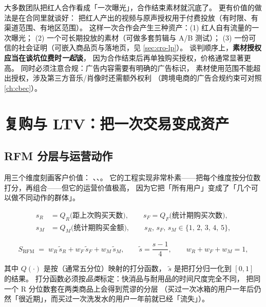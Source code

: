 \begin{keypoint}
大多数团队把红人合作看成「一次曝光」，合作结束素材就沉底了。
更有价值的做法是在合同里就谈好：
把红人产出的视频与原声授权用于付费投放（有时限、有渠道范围、有地区范围）。
这样一次合作会产生三种资产：(1) 红人自有流量的一次曝光；
(2) 一个可长期投放的素材（可做多套剪辑与 A/B 测试）；
(3) 一份可信的社会证明（可嵌入商品页与落地页，见 \cref{sec:cro-lp}）。
谈判顺序上，\textbf{素材授权应当在谈坑位费时\emph{一起}谈}，
因为合作结束后再单独购买授权，价格通常显著更高。
同时必须注意合规：广告内容需要有明确的广告标识，
素材使用范围不能超出授权，涉及第三方音乐/肖像时还需额外权利
（跨境电商的广告合规约束可对照 \cref{ch:cbec}）。
\end{keypoint}

\section{复购与 LTV：把一次交易变成资产}
\label{sec:cro-ltv}

\subsection{RFM 分层与运营动作}

 用三个维度刻画客户价值：
、、。
它的工程实现非常朴素——把每个维度按分位数打分，再组合——但它的运营价值极高，
因为它把「所有用户」变成了「几个可以做不同动作的群体」。

\begin{equation}
\begin{aligned}
s_R &= Q_R\big(\text{距上次购买天数}\big), \qquad
s_F = Q_F\big(\text{统计期购买次数}\big), \\[2pt]
s_M &= Q_M\big(\text{统计期购买金额}\big), \qquad
s_R,\, s_F,\, s_M \in \{1,\,2,\,3,\,4,\,5\} ,
\end{aligned}
\label{eq:rfm}
\end{equation}

\begin{equation}
S_{\text{RFM}} \;=\; w_R\,\tilde s_R + w_F\,\tilde s_F + w_M\,\tilde s_M ,
\qquad \tilde s = \frac{s-1}{4},\qquad w_R + w_F + w_M = 1 ,
\label{eq:rfm-score}
\end{equation}

其中 $Q(\cdot)$ 是按（通常五分位）映射的打分函数，
$\tilde s$ 是把打分归一化到 $[0,1]$ 的结果。
打分函数必须按\emph{品类}标定：快消品与耐用品的时间尺度完全不同，
把同一个 R 分位数套在两类商品上会得到荒谬的分层
（买过一次冰箱的用户一年后仍然「很近期」，而买过一次洗发水的用户一年前就已经「流失」）。

